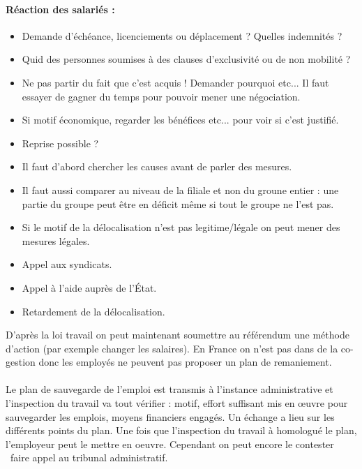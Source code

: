 \paragraph{Réaction des salariés :}
	\begin{itemize}
	\item[\textbullet] Demande d'échéance, licenciements ou déplacement ? Quelles indemnités ?
	\item[\textbullet] Quid des personnes soumises à des clauses d’exclusivité ou de non mobilité ?
	\item[\textbullet] Ne pas partir du fait que c'est acquis ! Demander pourquoi etc... Il faut essayer de gagner du temps pour pouvoir mener une négociation.
	\item[\textbullet] Si motif économique, regarder les bénéfices etc... pour voir si c'est justifié.
	\item[\textbullet] Reprise possible ?
	\item[\textbullet] Il faut d'abord chercher les causes avant de parler des mesures.
	\item[\textbullet] Il faut aussi comparer au niveau de la filiale et non du groune entier : une partie du groupe peut être en déficit même si tout le groupe ne l'est pas. 
	\item[\textbullet] Si le motif de la délocalisation n'est pas legitime/légale on peut mener des mesures légales.
	\item[\textbullet] Appel aux syndicats.
	\item[\textbullet] Appel à l'aide auprès de l'État.
	\item[\textbullet] Retardement de la délocalisation.
	\end{itemize}
	
	D'après la loi travail on peut maintenant soumettre au référendum une méthode d'action (par exemple changer les salaires).
	En France on n'est pas dans de la co-gestion donc les employés ne peuvent pas proposer un plan de remaniement.

	
\paragraph{}
Le plan de sauvegarde de l'emploi est transmis à l'instance administrative et l'inspection du travail va tout vérifier : motif, effort suffisant mis en œuvre pour sauvegarder les emplois, moyens financiers engagés.
Un échange a lieu sur les différents points du plan.
Une fois que l'inspection du travail à homologué le plan, l'employeur peut le mettre en oeuvre.
Cependant on peut encore le contester \textrightarrow\ faire appel au tribunal administratif.

